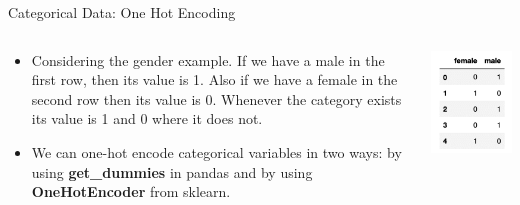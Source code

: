 \documentclass[11pt]{beamer}
\begin{document}
\begin{frame}{Categorical Data: One Hot Encoding}
\begin{columns}[T] %
\begin{column}{.48\textwidth}
        \begin{itemize}
		\item Considering the gender example. If we have a male in the first row, then its value is 1. Also if we have a female in the second row then its value is 0. Whenever the category exists its value is 1 and 0 where it does not. 
		\item We can one-hot encode categorical variables in two ways: by using \textbf{get\_dummies} in pandas and by using \textbf{OneHotEncoder} from sklearn.
        \end{itemize}
\end{column}%
\hfill%
\begin{column}{.48\textwidth}
        \includegraphics[width=\linewidth]{../05-pictures/lesson-2-1_pic_2.png}
\end{column}%
\end{columns}
\end{frame}
\end{document}

